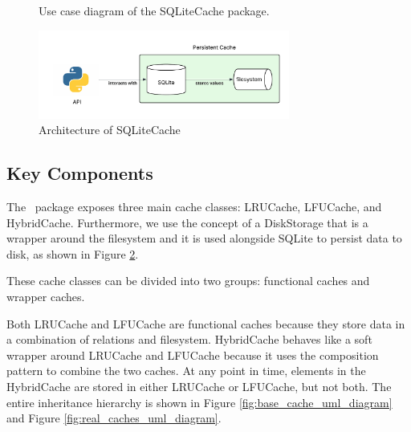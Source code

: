 \documentclass[11pt, journal]{IEEEtran}
\begin{document}
\begin{figure}
    \caption{Use case diagram of the SQLiteCache package.}
    \label{fig:use_case_diagram}
\end{figure}

\begin{figure}[ht]
    \centering
    \includegraphics[width=3.25in]{images/overall_architecture.png}
    \caption{Architecture of SQLiteCache}
    \label{fig:architecture}
\end{figure}

\subsection{Key Components}
The \sqlitecache~package exposes three main cache classes: LRUCache, LFUCache, and HybridCache.
Furthermore, we use the concept of a DiskStorage that is a wrapper around the filesystem
and it is used alongside SQLite to persist data to disk, as shown in Figure \ref{fig:architecture}.

These cache classes can be divided into two groups: functional caches and wrapper caches.

Both LRUCache and LFUCache are functional caches because they store data
in a combination of relations and filesystem.
HybridCache behaves like a soft wrapper around LRUCache and LFUCache because
it uses the composition pattern to combine the two caches. At any point in time,
elements in the HybridCache are stored in either LRUCache or LFUCache, but not both.
The entire inheritance hierarchy is shown in Figure \ref{fig:base_cache_uml_diagram}
and Figure \ref{fig:real_caches_uml_diagram}.
\end{document}
